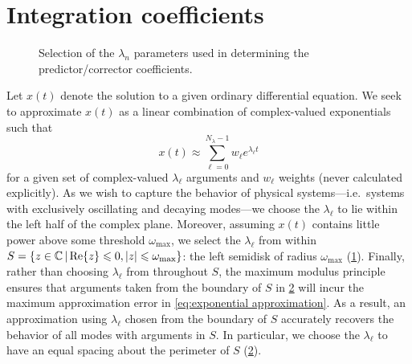 \section{Integration coefficients}

\begin{figure}
  \centering
  \begin{subfigure}{0.4\textwidth}
    \centering
    \caption{\label{fig:filled semidisk}}
  \end{subfigure}
  \hspace{1cm}
  \begin{subfigure}{0.4\textwidth}
    \centering
    \caption{\label{fig:discrete semidisk}}
  \end{subfigure}
  \caption{\label{fig:semidisk} Selection of the $\lambda_n$ parameters used in determining the predictor/corrector coefficients.
  }
\end{figure}

Let $x(t)$ denote the solution to a given ordinary differential equation.
We seek to approximate $x(t)$ as a linear combination of complex-valued exponentials such that
\begin{equation}
  x(t) \approx \sum_{\ell = 0}^{N_\lambda - 1} w_\ell e^{\lambda_\ell t}
  \label{eq:exponential approximation}
\end{equation}
for a given set of complex-valued $\lambda_\ell$ arguments and $w_\ell$ weights (never calculated explicitly).
As we wish to capture the behavior of physical systems---i.e.\ systems with exclusively oscillating and decaying modes---we choose the $\lambda_\ell$ to lie within the left half of the complex plane.
Moreover, assuming $x(t)$ contains little power above some threshold $\omega_\text{max}$, we select the $\lambda_\ell$ from within $S = \qty{z \in \mathbb{C} \, | \Re{z} \leqslant 0, \abs{z} \leqslant \omega_\text{max}}$: the left semidisk of radius $\omega_\text{max}$ (\cref{fig:filled semidisk}).
Finally, rather than choosing $\lambda_\ell$ from throughout $S$, the maximum modulus principle ensures that arguments taken from the boundary of $S$ in \cref{fig:discrete semidisk} will incur the maximum approximation error in \cref{eq:exponential approximation}. 
As a result, an approximation using $\lambda_\ell$ chosen from the boundary of $S$ accurately recovers the behavior of all modes with arguments in $S$.
In particular, we choose the $\lambda_\ell$ to have an equal spacing about the perimeter of $S$ (\cref{fig:discrete semidisk}).

